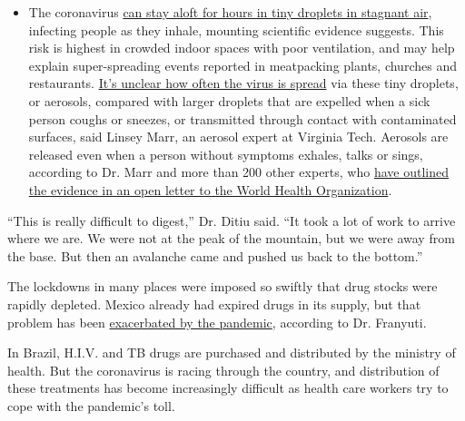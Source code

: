\begin{itemize}
  \begin{itemize}
  \tightlist
  \item
    The coronavirus
    \href{https://www.nytimes.com/2020/07/04/health/239-experts-with-one-big-claim-the-coronavirus-is-airborne.html?action=click\&pgtype=Article\&state=default\&region=MAIN_CONTENT_3\&context=storylines_faq}{can
    stay aloft for hours in tiny droplets in stagnant air}, infecting
    people as they inhale, mounting scientific evidence suggests. This
    risk is highest in crowded indoor spaces with poor ventilation, and
    may help explain super-spreading events reported in meatpacking
    plants, churches and restaurants.
    \href{https://www.nytimes.com/2020/07/06/health/coronavirus-airborne-aerosols.html?action=click\&pgtype=Article\&state=default\&region=MAIN_CONTENT_3\&context=storylines_faq}{It's
    unclear how often the virus is spread} via these tiny droplets, or
    aerosols, compared with larger droplets that are expelled when a
    sick person coughs or sneezes, or transmitted through contact with
    contaminated surfaces, said Linsey Marr, an aerosol expert at
    Virginia Tech. Aerosols are released even when a person without
    symptoms exhales, talks or sings, according to Dr. Marr and more
    than 200 other experts, who
    \href{https://academic.oup.com/cid/article/doi/10.1093/cid/ciaa939/5867798}{have
    outlined the evidence in an open letter to the World Health
    Organization}.
  \end{itemize}
\end{itemize}

``This is really difficult to digest,'' Dr. Ditiu said. ``It took a lot
of work to arrive where we are. We were not at the peak of the mountain,
but we were away from the base. But then an avalanche came and pushed us
back to the bottom.''

The lockdowns in many places were imposed so swiftly that drug stocks
were rapidly depleted. Mexico already had expired drugs in its supply,
but that problem has been
\href{https://www.reuters.com/article/us-health-coronavirus-lgbt-aids/no-medicine-no-food-coronavirus-restrictions-amplify-health-risks-to-lgbt-people-with-hiv-idUSKBN22W28G}{exacerbated
by the pandemic}, according to Dr. Franyuti.

In Brazil, H.I.V. and TB drugs are purchased and distributed by the
ministry of health. But the coronavirus is racing through the country,
and distribution of these treatments has become increasingly difficult
as health care workers try to cope with the pandemic's toll.

